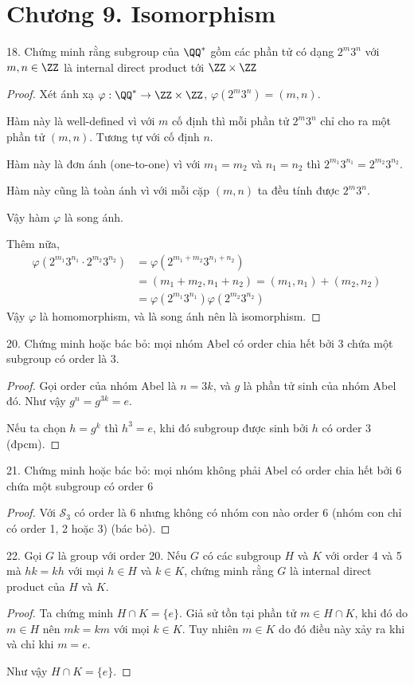 \section*{Chương 9. Isomorphism}

18. Chứng minh rằng subgroup của $\QQ^*$ gồm các phần tử có dạng $2^m 3^n$ với $m, n \in \ZZ$ là internal direct product tới $\ZZ \times \ZZ$

\begin{proof}
    Xét ánh xạ $\varphi: \QQ^* \rightarrow \ZZ \times \ZZ$, $\varphi(2^m 3^n) = (m, n)$.

    Hàm này là well-defined vì với $m$ cố định thì mỗi phần tử $2^m 3^n$ chỉ cho ra một phần tử $(m, n)$. Tương tự với cố định $n$.

    Hàm này là đơn ánh (one-to-one) vì với $m_1 = m_2$ và $n_1 = n_2$ thì $2^{m_1} 3^{n_1} = 2^{m_2} 3^{n_2}$.

    Hàm này cũng là toàn ánh vì với mỗi cặp $(m, n)$ ta đều tính được $2^m 3^n$.

    Vậy hàm $\varphi$ là song ánh.

    Thêm nữa, 
    \begin{align*}
        \varphi(2^{m_1} 3^{n_1} \cdot 2^{m_2} 3^{n_2})& = \varphi(2^{m_1 + m_2} 3^{n_1 + n_2}) \\
        & = (m_1 + m_2, n_1 + n_2) = (m_1, n_1) + (m_2, n_2) \\
        & = \varphi(2^{m_1} 3^{n_1}) \varphi(2^{m_2} 3^{n_2})
    \end{align*}
    Vậy $\varphi$ là homomorphism, và là song ánh nên là isomorphism.
\end{proof}

20. Chứng minh hoặc bác bỏ: mọi nhóm Abel có order chia hết bởi 3 chứa một subgroup có order là 3.

\begin{proof}
    Gọi order của nhóm Abel là $n=3k$, và $g$ là phần tử sinh của nhóm Abel đó. Như vậy $g^n = g^{3k} = e$.

    Nếu ta chọn $h = g^k$ thì $h^3 = e$, khi đó subgroup được sinh bởi $h$ có order 3 (đpcm).
\end{proof}

21. Chứng minh hoặc bác bỏ: mọi nhóm không phải Abel có order chia hết bởi 6 chứa một subgroup có order 6

\begin{proof}
    Với $\mathcal{S}_3$ có order là 6 nhưng không có nhóm con nào order 6 (nhóm con chỉ có order 1, 2 hoặc 3) (bác bỏ).
\end{proof}

22. Gọi $G$ là group với order 20. Nếu $G$ có các subgroup $H$ và $K$ với order 4 và 5 mà $hk=kh$ với mọi $h \in H$ và $k \in K$, chứng minh rằng $G$ là internal direct product của $H$ và $K$.

\begin{proof}
    Ta chứng minh $H \cap K = \{ e \}$. Giả sử tồn tại phần tử $m \in H \cap K$, khi đó do $m \in H$ nên $mk = km$ với mọi $k \in K$. Tuy nhiên $m \in K$ do đó điều này xảy ra khi và chỉ khi $m = e$.

    Như vậy $H \cap K = \{ e \}$.
\end{proof}

